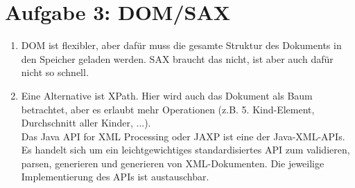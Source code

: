\documentclass{article}
\begin{document}
	\section*{Aufgabe 3: DOM/SAX}
	\begin{enumerate}[label=(\alph*)]
		\item DOM ist flexibler, aber dafür muss die gesamte Struktur des Dokuments in den Speicher geladen werden. SAX braucht das nicht, ist aber auch dafür nicht so schnell.
		\item Eine Alternative ist XPath. Hier wird auch das Dokument als Baum betrachtet, aber es erlaubt mehr Operationen (z.B. 5. Kind-Element, Durchschnitt aller Kinder, ...). \\
		Das Java API for XML Processing oder JAXP ist eine der Java-XML-APIs. Es handelt sich um ein leichtgewichtiges standardisiertes API zum validieren, parsen, generieren und generieren von XML-Dokumenten. Die jeweilige Implementierung des APIs ist austauschbar.
	\end{enumerate}
	
\end{document}
